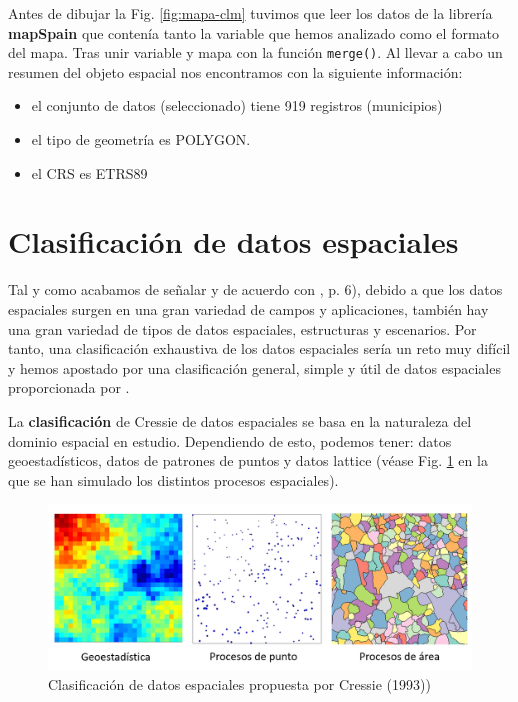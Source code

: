 \documentclass[
]{book}
\providecommand{\tightlist}{%
  \setlength{\itemsep}{0pt}\setlength{\parskip}{0pt}}
\theoremstyle{definition}
\theoremstyle{definition}
\theoremstyle{definition}
\theoremstyle{definition}
\theoremstyle{remark}
\begin{document}
Antes de dibujar la Fig. \ref{fig:mapa-clm} tuvimos que leer los datos de la
librería \textbf{mapSpain} \citep{rmapspain} que contenía tanto la variable que hemos
analizado como el formato del mapa. Tras unir variable y mapa con la función
\texttt{merge()}. Al llevar a cabo un resumen del objeto espacial nos encontramos con
la siguiente información:

\begin{itemize}
\tightlist
\item
  el conjunto de datos (seleccionado) tiene 919 registros (municipios)
\item
  el tipo de geometría es POLYGON.
\item
  el CRS es ETRS89
\end{itemize}

\hypertarget{clasificaciuxf3n-de-datos-espaciales}{%
\section{Clasificación de datos espaciales}\label{clasificaciuxf3n-de-datos-espaciales}}

Tal y como acabamos de señalar y de acuerdo con \citet{Schabenberger_Gotway_2005}, p.
6), debido a que los datos espaciales surgen en una gran variedad de campos y
aplicaciones, también hay una gran variedad de tipos de datos espaciales,
estructuras y escenarios. Por tanto, una clasificación exhaustiva de los datos
espaciales sería un reto muy difícil y hemos apostado por una clasificación
general, simple y útil de datos espaciales proporcionada por \citet{cressie1993}.

La \textbf{clasificación} de Cressie de datos espaciales se basa en la naturaleza del
dominio espacial en estudio. Dependiendo de esto, podemos tener: datos
geoestadísticos, datos de patrones de puntos y datos lattice (véase Fig.
\ref{fig:hengl-cressie} en la que se han simulado los distintos procesos
espaciales).

\begin{figure}

{\centering \includegraphics[width=0.6\linewidth]{img/cressie_simulados} 

}

\caption{Clasificación de datos espaciales propuesta por Cressie (1993))}\label{fig:hengl-cressie}
\end{figure}
\end{document}
